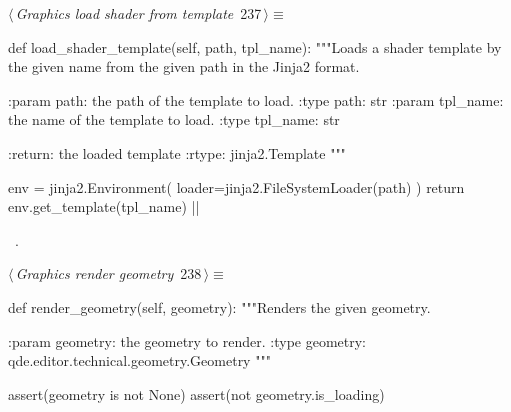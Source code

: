 \documentclass[%
    a4paper,    %
    justified,  %
    nobib,      %
    openany     %
]{tufte-book}
\makeatletter
\renewcommand{\label}[1]{\@tufte@label{##1}}%
\makeatother
\begin{document}
\begin{fullwidth}
\begin{flushleft}
\begin{minipage}{\linewidth}
\begin{list}{}{\setlength{\itemsep}{-\parsep}\setlength{\itemindent}{-\leftmargin}}
\item{}
\end{list}
\end{minipage}\vspace{4ex}
\end{flushleft}
\begin{flushleft} \small
\begin{minipage}{\linewidth}\label{scrap254}\raggedright\small
{} $\langle\,${\itshape Graphics load shader from template}\nobreak\ {\footnotesize {237}}$\,\rangle\equiv$
\vspace{-1ex}
\begin{pythoncode}
def load_shader_template(self, path, tpl_name):
    """Loads a shader template by the given name from the given path in the
    Jinja2 format.

    :param path: the path of the template to load.
    :type  path: str
    :param tpl_name: the name of the template to load.
    :type  tpl_name: str

    :return: the loaded template
    :rtype:  jinja2.Template
    """

    env = jinja2.Environment(
        loader=jinja2.FileSystemLoader(path)
    )
    return env.get_template(tpl_name)
|\NWsep|
\end{pythoncode}
\vspace{1.5ex}
\footnotesize
\begin{list}{}{\setlength{\itemsep}{-\parsep}\setlength{\itemindent}{-\leftmargin}}
\item \NWtxtMacroRefIn\ .

\item{}
\end{list}
\end{minipage}\vspace{4ex}
\end{flushleft}
\begin{flushleft} \small
\begin{minipage}{\linewidth}\label{scrap255}\raggedright\small
{} $\langle\,${\itshape Graphics render geometry}\nobreak\ {\footnotesize {238}}$\,\rangle\equiv$
\vspace{-1ex}
\begin{pythoncode}
def render_geometry(self, geometry):
    """Renders the given geometry.

    :param geometry: the geometry to render.
    :type geometry:  qde.editor.technical.geometry.Geometry
    """

    assert(geometry is not None)
    assert(not geometry.is_loading)


\end{pythoncode}
\end{minipage}
\end{flushleft}
\end{fullwidth}
\end{document}
